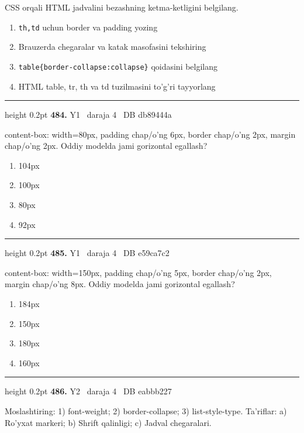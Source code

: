\documentclass[10pt,a4paper,oneside]{article}
\begin{document}
\par
CSS orqali HTML jadvalini bezashning ketma-ketligini belgilang.
\begin{enumerate}[label=\Alph*),leftmargin=9mm]
\item \texttt{th,td} uchun border va padding yozing
\item Brauzerda chegaralar va katak masofasini tekshiring
\item \texttt{table\{border-collapse:collapse\}} qoidasini belgilang
\item HTML table, tr, th va td tuzilmasini to'g'ri tayyorlang
\end{enumerate}
\vspace{2mm}\hrule height 0.2pt \vspace{4mm}
\hypertarget{q484}{\textbf{\color{ink}484.}}  {\color{muted}\scriptsize Y1 \textbullet\ daraja 4 \textbullet\ DB db89444a}
\par
content-box: width=80px, padding chap/o'ng 6px, border chap/o'ng 2px, margin chap/o'ng 2px. Oddiy modelda jami gorizontal egallash?
\begin{enumerate}[label=\Alph*),leftmargin=9mm]
\item 104px
\item 100px
\item 80px
\item 92px
\end{enumerate}
\vspace{2mm}\hrule height 0.2pt \vspace{4mm}
\hypertarget{q485}{\textbf{\color{ink}485.}}  {\color{muted}\scriptsize Y1 \textbullet\ daraja 4 \textbullet\ DB e59ca7c2}
\par
content-box: width=150px, padding chap/o'ng 5px, border chap/o'ng 2px, margin chap/o'ng 8px. Oddiy modelda jami gorizontal egallash?
\begin{enumerate}[label=\Alph*),leftmargin=9mm]
\item 184px
\item 150px
\item 180px
\item 160px
\end{enumerate}
\vspace{2mm}\hrule height 0.2pt \vspace{4mm}
\hypertarget{q486}{\textbf{\color{ink}486.}}  {\color{muted}\scriptsize Y2 \textbullet\ daraja 4 \textbullet\ DB eabbb227}
\par
Moslashtiring: 1) font-weight; 2) border-collapse; 3) list-style-type. Ta'riflar: a) Ro'yxat markeri; b) Shrift qalinligi; c) Jadval chegaralari.
\end{document}
